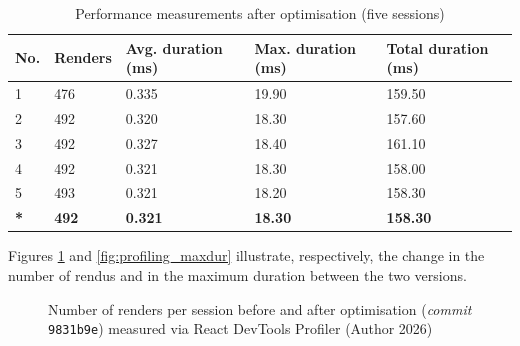 \begin{table}[H]
    \centering
    \caption{Performance measurements after optimisation (five sessions)}
    \renewcommand{\arraystretch}{1.5}
    \begin{tabular}{p{0.8cm} p{2.5cm} p{3cm} p{3cm} p{3cm}}
        \hline
        \textbf{No.} & \textbf{Renders} & \textbf{Avg. duration (ms)} & \textbf{Max. duration (ms)} & \textbf{Total duration (ms)} \\
        \hline
        1 & 476 & 0.335 & 19.90 & 159.50 \\
        2 & 492 & 0.320 & 18.30 & 157.60 \\
        3 & 492 & 0.327 & 18.40 & 161.10 \\
        4 & 492 & 0.321 & 18.30 & 158.00 \\
        5 & 493 & 0.321 & 18.20 & 158.30 \\
        \hline
        \textbf{*} & \textbf{492} & \textbf{0.321} & \textbf{18.30} & \textbf{158.30} \\
        \hline
    \end{tabular}
    \par{}
    \label{tab:profiling_after}
\end{table}

\clearpage

Figures \ref{fig:profiling_renders} and \ref{fig:profiling_maxdur} illustrate, respectively, the change in the number of \glspl{rendu} and in the maximum duration between the two versions.

\begin{figure}[H]
    \centering
    \caption{Number of renders per session before and after optimisation (\textit{commit} \texttt{9831b9e}) measured via React DevTools Profiler (Author 2026)}
    \label{fig:profiling_renders}
\end{figure}

